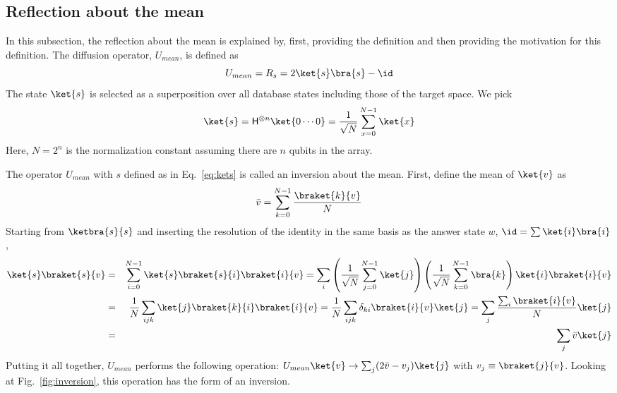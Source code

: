 \documentclass[11pt,oneside,final]{huthesis}%
\begin{document}
\subsection{Reflection about the mean}\label{sec:inversion}

In this subsection, the reflection about the mean is explained by, first, providing the definition and then providing the motivation for this definition.  
The diffusion operator, $U_{mean}$, is defined as
\begin{equation}
	U_{mean}=R_s=2\ket{s}\bra{s}-\id
	\label{eq:inversion}
\end{equation}
The state $\ket{s}$ is selected as a superposition over all database states including those of the target space. We pick
\begin{equation}
	\ket{s}={\sf H}^{\otimes n}\ket{0\cdots0}=\frac{1}{\sqrt{N}}\sum_{x=0}^{N-1}\ket{x}\label{eq:kets}
\end{equation}
Here, $N=2^n$ is the normalization constant assuming there are $n$ qubits in the array.

The operator $U_{mean}$ with $s$ defined as in Eq.~\eqref{eq:kets} is called an inversion about the mean.  First, define the mean of $\ket{v}$ as
\[\bar{v}=\sum_{k=0}^{N-1} \frac{\braket{k}{v}}{N}\]
Starting from $\ketbra{s}{s}$ and inserting the resolution of the identity in the same basis as the answer state $w$, $\id=\sum\ket{i}\bra{i}$,
\begin{eqnarray}
	\ket{s}\braket{s}{v}&=&\sum_{i=0}^{N-1} 	\ket{s}\braket{s}{i}\braket{i}{v}=\sum_{i}  \left(\frac{1}{\sqrt{N}}\sum_{j=0}^{N-1} \ket{j} \right)\left( \frac{1}{\sqrt{N}} \sum_{k=0}^{N-1}\bra{k} \right)\ket{i}\braket{i}{v}\\
	&=& \frac{1}{N}\sum_{ijk}\ket{j}\braket{k}{i}\braket{i}{v}= \frac{1}{N}\sum_{ijk}\delta_{ki}\braket{i}{v}\ket{j}= \sum_{j}\frac{\sum_i\braket{i}{v}}{N}\ket{j}\\
	&=&  \sum_{j}\bar{v}\ket{j}
	\label{eq:avg_inv}
\end{eqnarray}
Putting it all together, $U_{mean}$ performs the following operation: $U_{mean}\ket{v}\rightarrow\sum_j (2\bar{v}-v_j)\ket{j}$ with $v_j\equiv \braket{j}{v}$. 
Looking at Fig.~\ref{fig:inversion}, this operation has the form of an inversion.
\end{document}
